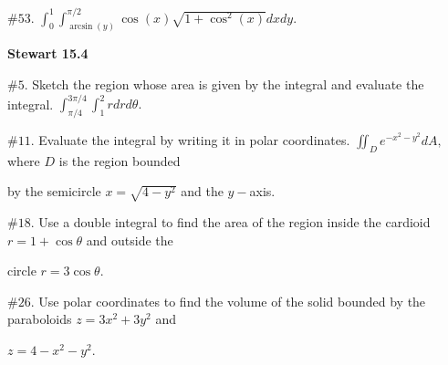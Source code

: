 \documentclass[11 pt]{report}
\begin{document}
\vspace{.2cm}

$\# 53.$ $\displaystyle{\int_0^1 \int_{\arcsin(y)}^{\pi/2} \cos (x) \sqrt{1+\cos^2 (x)} dx dy}.$

\vspace{.4cm}

\noindent \textbf{Stewart 15.4} 

\vspace{.2cm}

$\# 5.$ Sketch the region whose area is given by the integral and evaluate the integral. $\displaystyle{\int_{\pi/4}^{3\pi/4} \int_1^2 r dr d\theta.}$

\vspace{.2cm}

$\# 11.$ Evaluate the integral by writing it in polar coordinates. $\displaystyle{\iint_D e^{-x^2-y^2} dA,}$ where $D$ is the region bounded 

by the semicircle $x = \sqrt{4-y^2}$ and the $y-$axis. 

\vspace{.2cm}

$\# 18.$ Use a double integral to find the area of the region inside the cardioid $r = 1+\cos\theta$ and outside the 

circle $r = 3 \cos \theta.$ 

\vspace{.2cm}

$\# 26.$ Use polar coordinates to find the volume of the solid bounded by the paraboloids $z = 3x^2+3y^2$ and 

$z = 4-x^2-y^2$. 

\vspace{.3cm}
\end{document}
